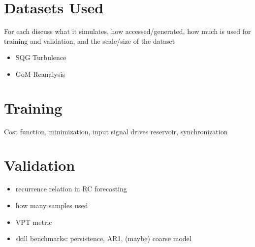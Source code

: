 
\section{Datasets Used}
\label{sec:datasets}

For each discuss what it simulates, how accessed/generated, how much is used for
training and validation, and the scale/size of the dataset
\begin{itemize}
    \item SQG Turbulence
    \item GoM Reanalysis
\end{itemize}

\section{Training}
\label{subsec:training}

Cost function, minimization, input signal drives reservoir, synchronization

\section{Validation}
\label{subsec:validation}

\begin{itemize}
    \item recurrence relation in RC forecasting
    \item how many samples used
    \item VPT metric
    \item skill benchmarks: persistence, AR1, (maybe) coarse model
\end{itemize}
